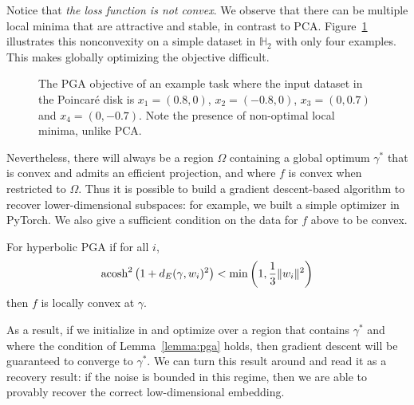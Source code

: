 Notice that \emph{the loss function is not convex}. We observe that
there can be multiple local minima that are attractive and stable, in
contrast to PCA.  Figure~\ref{fig:pga} illustrates this nonconvexity
on a simple dataset in $\mathbb{H}_2$ with only four examples.  This
makes globally optimizing the objective difficult.
\begin{figure}
\centering
\resizebox{0.48\textwidth}{!}{\large}
\caption{The PGA objective of an example task where the input dataset in the Poincar{\'e} disk is $x_1 = (0.8,0)$, $x_2 = (-0.8,0)$, $x_3 = (0,0.7)$ and $x_4 = (0,-0.7)$. Note the presence of non-optimal local minima, unlike PCA.}
\label{fig:pga}
\end{figure}

Nevertheless, there will always be a region $\Omega$ containing a
global optimum $\gamma^*$ that is convex and admits an efficient
projection, and where $f$ is convex when restricted to $\Omega$. Thus
it is possible to build a gradient descent-based algorithm to recover
lower-dimensional subspaces: for example, we built a simple optimizer
in PyTorch.  We also give a sufficient condition on the data for $f$ above
to be convex.
\begin{lemma}
For hyperbolic PGA if for all $i$,
\[
  \operatorname{acosh}^2\left( 1 + d_{E}(\gamma,w_i)^2 \right) < \min\left(1, \frac{1}{3} \| w_i \|^2 \right)
\]
then $f$ is locally convex at $\gamma$.
\label{lemma:pga}
\end{lemma}
As a result, if we initialize in and optimize over a region that
contains $\gamma^*$ and where the condition of Lemma~\ref{lemma:pga}
holds, then gradient descent will be guaranteed to converge to
$\gamma^*$. We can turn this result around and read it as a recovery
result: if the noise is bounded in this regime, then we are able to
provably recover the correct low-dimensional embedding.



